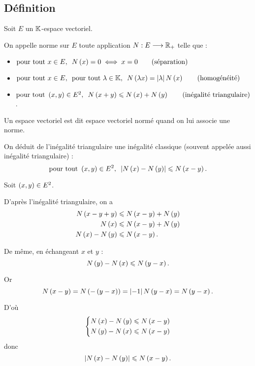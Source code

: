 \subsection{Définition}

\begin{defi}
Soit \(E\) un \(\mathbb{K}\)-espace vectoriel.

On appelle norme sur \(E\) toute application \(N:E\longrightarrow\mathbb{R}_+\) telle que :

\begin{itemize}
    \item \(\quantifs{\tpt x\in E}N\paren{x}=0\ssi x=0\qquad\text{(séparation)}\) \\
    \item \(\quantifs{\tpt x\in E;\tpt\lambda\in\K}N\paren{\lambda x}=\abs{\lambda}N\paren{x}\qquad\text{(homogénéité)}\) \\
    \item \(\quantifs{\tpt\paren{x,y}\in E^2}N\paren{x+y}\leq N\paren{x}+N\paren{y}\qquad\text{(inégalité triangulaire)}\).
\end{itemize}

Un espace vectoriel est dit espace vectoriel normé quand on lui associe une norme.
\end{defi}

On déduit de l'inégalité triangulaire une inégalité classique (souvent appelée aussi inégalité triangulaire) : \[\quantifs{\tpt\paren{x,y}\in E^2}\abs{N\paren{x}-N\paren{y}}\leq N\paren{x-y}.\]

\begin{dem}
Soit \(\left(x,y\right)\in E^2\).

D'après l'inégalité triangulaire, on a \[\begin{aligned}
N\left(x-y+y\right)&\leqslant N\left(x-y\right)+N\left(y\right) \\
N\left(x\right)&\leqslant N\left(x-y\right)+N\left(y\right) \\
N\left(x\right)-N\left(y\right)&\leqslant N\left(x-y\right).
\end{aligned}\]

De même, en échangeant \(x\) et \(y\) : \[N\left(y\right)-N\left(x\right)\leqslant N\left(y-x\right).\]

Or \[N\left(x-y\right)=N\left(-\left(y-x\right)\right)=\left\lvert-1\right\rvert N\left(y-x\right)=N\left(y-x\right).\]

D'où \[\begin{dcases}
N\left(x\right)-N\left(y\right)\leqslant N\left(x-y\right) \\
N\left(y\right)-N\left(x\right)\leqslant N\left(x-y\right)
\end{dcases}\] donc \[\left\lvert N\left(x\right)-N\left(y\right)\right\rvert\leqslant N\left(x-y\right).\]
\end{dem}

